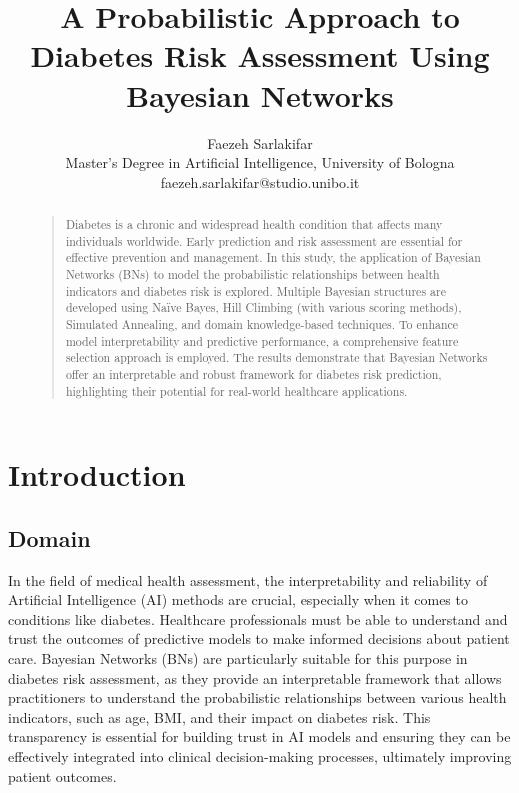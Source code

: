 \documentclass[letterpaper]{article}
\begin{document}
 	
%
\title{A Probabilistic Approach to Diabetes Risk Assessment Using Bayesian Networks}
\author{Faezeh Sarlakifar\\
Master's Degree in Artificial Intelligence, University of Bologna\\
faezeh.sarlakifar@studio.unibo.it
}
\maketitle


\begin{abstract}
\begin{quote}

Diabetes is a chronic and widespread health condition that affects many individuals worldwide. Early prediction and risk assessment are essential for effective prevention and management. In this study, the application of Bayesian Networks (BNs) to model the probabilistic relationships between health indicators and diabetes risk is explored. Multiple Bayesian structures are developed using Naïve Bayes, Hill Climbing (with various scoring methods), Simulated Annealing, and domain knowledge-based techniques. To enhance model interpretability and predictive performance, a comprehensive feature selection approach is employed. The results demonstrate that Bayesian Networks offer an interpretable and robust framework for diabetes risk prediction, highlighting their potential for real-world healthcare applications.

\end{quote}
\end{abstract}


\section{Introduction}

\subsection{Domain}

In the field of medical health assessment, the interpretability and reliability of Artificial Intelligence (AI) methods are crucial, especially when it comes to conditions like diabetes. Healthcare professionals must be able to understand and trust the outcomes of predictive models to make informed decisions about patient care. Bayesian Networks (BNs) are particularly suitable for this purpose in diabetes risk assessment, as they provide an interpretable framework that allows practitioners to understand the probabilistic relationships between various health indicators, such as age, BMI, and their impact on diabetes risk. This transparency is essential for building trust in AI models and ensuring they can be effectively integrated into clinical decision-making processes, ultimately improving patient outcomes.
\end{document}
